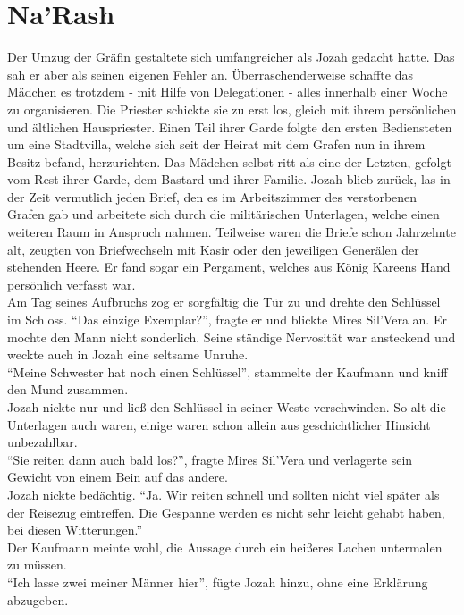 \chapter{Na'Rash}

Der Umzug der Gräfin gestaltete sich umfangreicher als Jozah gedacht hatte. Das sah er aber als 
seinen eigenen Fehler an. Überraschenderweise schaffte das Mädchen es trotzdem - mit Hilfe von 
Delegationen - alles innerhalb einer Woche zu organisieren. Die Priester schickte sie zu erst los, 
gleich mit ihrem persönlichen und ältlichen Hauspriester. Einen Teil ihrer Garde folgte den ersten 
Bediensteten um eine Stadtvilla, welche sich seit der Heirat mit dem Grafen nun in ihrem Besitz 
befand, herzurichten. Das Mädchen selbst ritt als eine der Letzten, gefolgt vom Rest ihrer Garde, 
dem Bastard und ihrer Familie. Jozah blieb zurück, las in der Zeit vermutlich jeden Brief, den es 
im Arbeitszimmer des verstorbenen Grafen gab und arbeitete sich durch die militärischen Unterlagen, 
welche einen weiteren Raum in Anspruch nahmen. Teilweise waren die Briefe schon Jahrzehnte alt, 
zeugten von Briefwechseln mit Kasir oder den jeweiligen Generälen der stehenden Heere. Er fand 
sogar ein Pergament, welches aus König Kareens Hand persönlich verfasst war.\\
Am Tag seines Aufbruchs zog er sorgfältig die Tür zu und drehte den Schlüssel im Schloss. 
``Das einzige Exemplar?'', fragte er und blickte Mires Sil'Vera an. Er mochte den Mann nicht 
sonderlich. Seine ständige Nervosität war ansteckend und weckte auch in Jozah eine seltsame 
Unruhe.\\
``Meine Schwester hat noch einen Schlüssel'', stammelte der Kaufmann und kniff den Mund zusammen.\\
Jozah nickte nur und ließ den Schlüssel in seiner Weste verschwinden. So alt die Unterlagen auch 
waren, einige waren schon allein aus geschichtlicher Hinsicht unbezahlbar.\\
``Sie reiten dann auch bald los?'', fragte Mires Sil'Vera und verlagerte sein Gewicht von einem 
Bein auf das andere.\\
Jozah nickte bedächtig. ``Ja. Wir reiten schnell und sollten nicht viel später als der Reisezug 
eintreffen. Die Gespanne werden es nicht sehr leicht gehabt haben, bei diesen Witterungen.''\\
Der Kaufmann meinte wohl, die Aussage durch ein heißeres Lachen untermalen zu müssen.\\
``Ich lasse zwei meiner Männer hier'', fügte Jozah hinzu, ohne eine Erklärung abzugeben.\\
